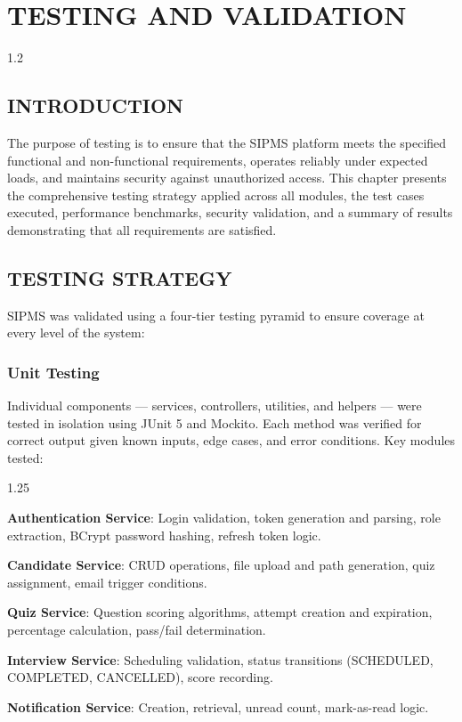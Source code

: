 \chapter{TESTING AND VALIDATION}
\begin{spacing}{1.2}
\minitoc
\thispagestyle{MyStyle}
\end{spacing}
\newpage

\section{INTRODUCTION}
The purpose of testing is to ensure that the SIPMS platform meets the specified functional and non-functional requirements, operates reliably under expected loads, and maintains security against unauthorized access. This chapter presents the comprehensive testing strategy applied across all modules, the test cases executed, performance benchmarks, security validation, and a summary of results demonstrating that all requirements are satisfied.

\section{TESTING STRATEGY}
SIPMS was validated using a four-tier testing pyramid to ensure coverage at every level of the system:

\subsection{Unit Testing}
Individual components — services, controllers, utilities, and helpers — were tested in isolation using JUnit 5 and Mockito. Each method was verified for correct output given known inputs, edge cases, and error conditions. Key modules tested:

\renewcommand{\labelitemi}{\tiny$\bullet$}
\begin{itemize}[leftmargin=2cm, topsep=4pt]
    \begin{spacing}{1.25}
        \item \textbf{Authentication Service}: Login validation, token generation and parsing, role extraction, BCrypt password hashing, refresh token logic.
        \item \textbf{Candidate Service}: CRUD operations, file upload and path generation, quiz assignment, email trigger conditions.
        \item \textbf{Quiz Service}: Question scoring algorithms, attempt creation and expiration, percentage calculation, pass/fail determination.
        \item \textbf{Interview Service}: Scheduling validation, status transitions (SCHEDULED, COMPLETED, CANCELLED), score recording.
        \item \textbf{Notification Service}: Creation, retrieval, unread count, mark-as-read logic.
    \end{spacing}
\end{itemize}

